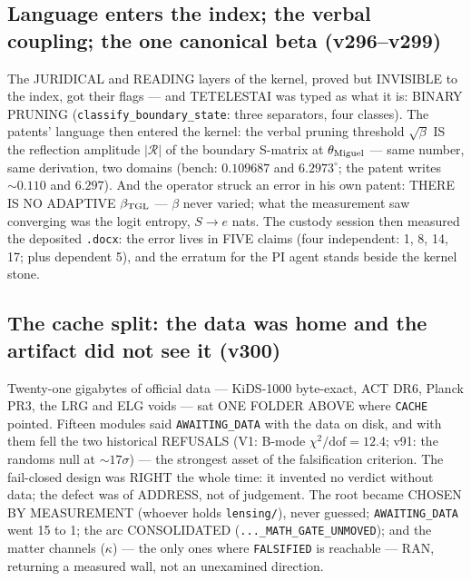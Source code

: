 \documentclass[11pt]{article}
\theoremstyle{definition}\newtheorem{deriv}{Derivation}
\begin{document}
\subsection*{Language enters the index; the verbal coupling; the one canonical beta (v296--v299)}The JURIDICAL and READING layers of the kernel, proved but INVISIBLE to the index, got their flags --- and TETELESTAI was typed as what it is: BINARY PRUNING (\texttt{classify\_boundary\_state}: three separators, four classes). The patents' language then entered the kernel: the verbal pruning threshold $\sqrt\beta$ IS the reflection amplitude $|\mathcal{R}|$ of the boundary S-matrix at $\theta_{\rm Miguel}$ --- same number, same derivation, two domains (bench: $0.109687$ and $6.2973^\circ$; the patent writes $\sim0.110$ and $6.297$). And the operator struck an error in his own patent: THERE IS NO ADAPTIVE $\beta_{\rm TGL}$ --- $\beta$ never varied; what the measurement saw converging was the logit entropy, $S\to e$ nats. The custody session then measured the deposited \texttt{.docx}: the error lives in FIVE claims (four independent: 1, 8, 14, 17; plus dependent 5), and the erratum for the PI agent stands beside the kernel stone.

\subsection*{The cache split: the data was home and the artifact did not see it (v300)}Twenty-one gigabytes of official data --- KiDS-1000 byte-exact, ACT DR6, Planck PR3, the LRG and ELG voids --- sat ONE FOLDER ABOVE where \texttt{CACHE} pointed. Fifteen modules said \texttt{AWAITING\_DATA} with the data on disk, and with them fell the two historical REFUSALS (V1: B-mode $\chi^2/\mathrm{dof}=12.4$; v91: the randoms null at ${\sim}17\sigma$) --- the strongest asset of the falsification criterion. The fail-closed design was RIGHT the whole time: it invented no verdict without data; the defect was of ADDRESS, not of judgement. The root became CHOSEN BY MEASUREMENT (whoever holds \texttt{lensing/}), never guessed; \texttt{AWAITING\_DATA} went 15 to 1; the arc CONSOLIDATED (\texttt{...\_MATH\_GATE\_UNMOVED}); and the matter channels ($\kappa$) --- the only ones where \texttt{FALSIFIED} is reachable --- RAN, returning a measured wall, not an unexamined direction.
\end{document}
